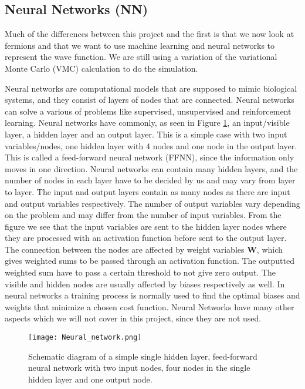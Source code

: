 \documentclass[12pt,a4paper,english]{article}
\begin{document}
\subsection{Neural Networks (NN)}
\label{subsect:NN}
Much of the differences between this project and the first is that we now look at fermions and that we want to use machine learning and neural networks to represent the wave function. We are still using a variation of the variational Monte Carlo (VMC) calculation to do the simulation.

Neural networks are computational models that are supposed to mimic biological systems, and they consist of layers of nodes that are connected. Neural networks can solve a various of problems like supervised, unsupervised and reinforcement learning. Neural networks have commonly, as seen in Figure \ref{fig:Neural_network}, an input/visible layer, a hidden layer and an output layer. This is a simple case with two input variables/nodes, one hidden layer with 4 nodes and one node in the output layer. This is called a feed-forward neural network (FFNN), since the information only moves in one direction. Neural networks can contain many hidden layers, and the number of nodes in each layer have to be decided by us and may vary from layer to layer. The input and output layers contain as many nodes as there are input and output variables respectively. The number of output variables vary depending on the problem and may differ from the number of input variables. From the figure we see that the input variables are sent to the hidden layer nodes where they are processed with an activation function before sent to the output layer. The connection between the nodes are affected by weight variables \textbf{W}, which gives weighted sums to be passed through an activation function. The outputted weighted sum have to pass a certain threshold to not give zero output. The visible and hidden nodes are usually affected by biases respectively as well. In neural networks a training process is normally used to find the optimal biases and weights that minimize a chosen cost function. Neural Networks have many other aspects which we will not cover in this project, since they are not used.

\begin{figure}[htbp]
	\centering\texttt{[image: Neural\_network.png]}
	\caption{Schematic diagram of a simple single hidden layer, feed-forward neural network with two input nodes, four nodes in the single hidden layer and one output node.\label{fig:Neural_network}}
\end{figure} 
\end{document}
